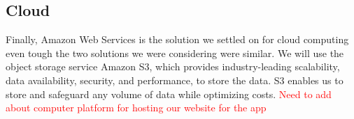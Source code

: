 \subsection{Cloud}
Finally, Amazon Web Services is the solution we settled on for cloud computing even tough the two solutions we were considering were similar. We will use the object storage service Amazon S3, which provides industry-leading scalability, data availability, security, and performance, to store the data. S3 enables us to store and safeguard any volume of data while optimizing costs. 
\textcolor{red}{Need to add about computer platform for hosting our website for the app}